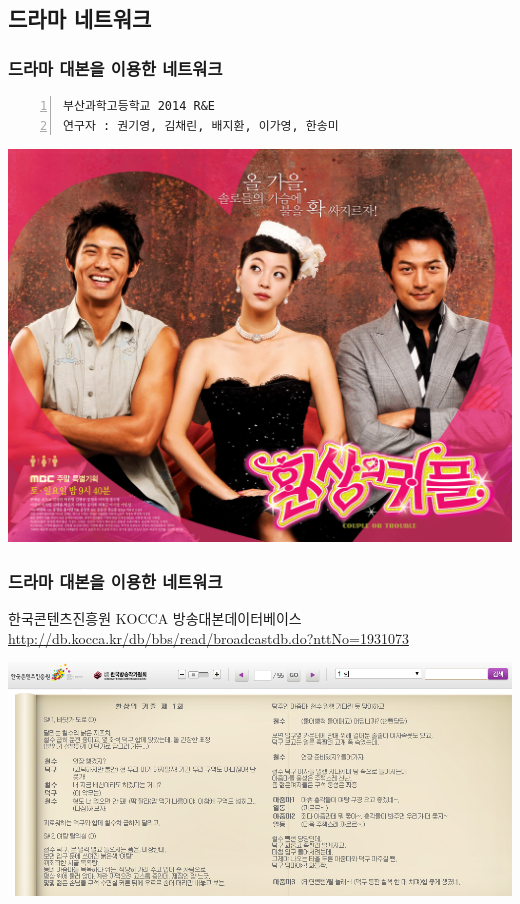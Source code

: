 \documentclass{beamer}
\begin{document}
\subsection{드라마 네트워크}
\begin{frame}[fragile]
\frametitle{드라마 대본을 이용한 네트워크}
\begin{block}{}
	\begin{Verbatim}[numbers=left,commandchars=\\\{\}]
부산과학고등학교 2014 R&E
연구자 : 권기영, 김채린, 배지환, 이가영, 한송미
	\end{Verbatim}
\end{block}
\begin{center}
\includegraphics[scale=0.5]{couple.png}
\end{center}
\end{frame}

\begin{frame}
\frametitle{드라마 대본을 이용한 네트워크}
한국콘텐츠진흥원 KOCCA 방송대본데이터베이스\\
\href{http://db.kocca.kr/db/bbs/read/broadcastdb.do?nttNo=1931073}{http://db.kocca.kr/db/bbs/read/broadcastdb.do?nttNo=1931073}
\begin{center}
\includegraphics[scale=0.5]{kocca.png}
\end{center}
\end{frame}
\end{document}
